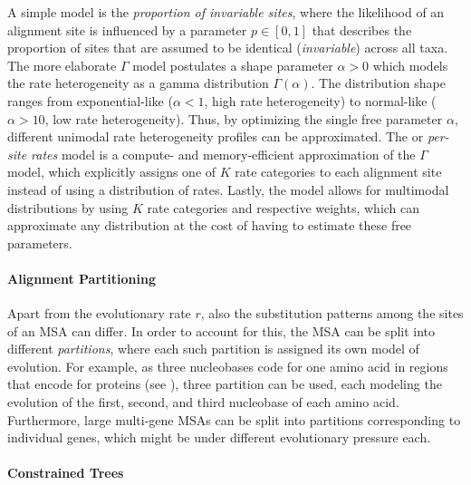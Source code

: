 A simple model is the \emph{proportion of invariable sites},
where the likelihood of an alignment site is influenced by a parameter $p \in [0,1]$
that describes the proportion of sites that are assumed to be identical (\emph{invariable}) across all taxa.
The more elaborate $\Gamma$ model \cite{Yang1994a} postulates a shape parameter $\alpha > 0$
which models the rate heterogeneity as a gamma distribution $\Gamma(\alpha)$.
The distribution shape ranges from exponential-like ($\alpha < 1$, high rate heterogeneity)
to normal-like ($\alpha > 10$, low rate heterogeneity).
Thus, by optimizing the single free parameter $\alpha$,
different unimodal rate heterogeneity profiles can be approximated.
The  or \emph{per-site rates} model \cite{Stamatakis2006a}
is a compute- and memory-efficient approximation of the $\Gamma$ model,
which explicitly assigns one of $K$ rate categories to each alignment site instead of using a distribution of rates.
Lastly, the  model \cite{Yang1995} allows for multimodal distributions
by using $K$ rate categories and respective weights,
which can approximate any distribution at the cost of having to estimate these free parameters.

\paragraph{Alignment Partitioning}
\label{ch:Foundations:sec:MLTreeInference:sub:FurtherAspects:par:AlignmentPartitioning}

Apart from the evolutionary rate $r$, also the substitution patterns among the sites of an MSA can differ.
In order to account for this, the MSA can be split into different \emph{partitions},
where each such partition is assigned its own model of evolution.
For example, as three nucleobases code for one amino acid in regions that encode for proteins
(see ),
three partition can be used, each modeling the evolution of the first, second, and third nucleobase of each amino acid.
Furthermore, large multi-gene MSAs can be split into partitions corresponding to individual genes,
which might be under different evolutionary pressure each.

\paragraph{Constrained Trees}
\label{ch:Foundations:sec:MLTreeInference:sub:FurtherAspects:par:ConstrainedTrees}

